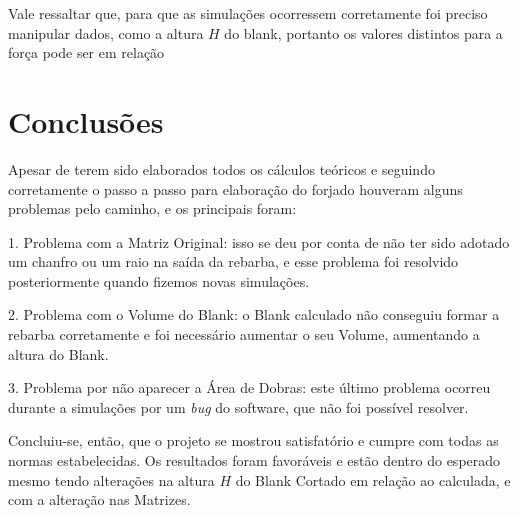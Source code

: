 \documentclass[deposito, acronym, symbols]{fei}
\begin{document}
Vale ressaltar que, para que as simulações ocorressem corretamente foi preciso manipular dados, como a altura $H$ do blank, portanto os valores distintos para a força pode ser em relação  

\chapter{Conclusões}

Apesar de terem sido elaborados todos os cálculos teóricos e seguindo corretamente o passo a passo para elaboração do forjado houveram alguns problemas pelo caminho, e os principais foram: 

1. Problema com a Matriz Original: isso se deu por conta de não ter sido adotado um chanfro ou um raio na saída da rebarba, e esse problema foi resolvido posteriormente quando fizemos novas simulações.

2. Problema com o Volume do Blank: o Blank calculado não conseguiu formar a rebarba corretamente e foi necessário aumentar o seu Volume, aumentando a altura do Blank.

3. Problema por não aparecer a Área de Dobras: este último problema ocorreu durante a simulações por um \textit{bug} do software, que não foi possível resolver.

Concluiu-se, então, que o projeto se mostrou satisfatório e cumpre com todas as normas estabelecidas. Os resultados foram favoráveis e estão dentro do esperado mesmo tendo alterações na altura $H$ do Blank Cortado em relação ao calculada, e com a alteração nas Matrizes. 

\printbibliography
\end{document}
